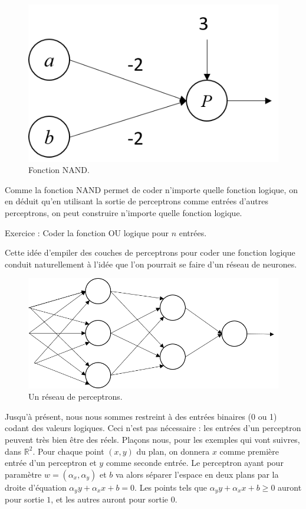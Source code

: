 \begin{figure}[h]
  \centering
  \includegraphics[scale=0.5]{assets/nand-perceptron}
  \caption{Fonction NAND.}
  \label{fig:nand-perceptron}
\end{figure}

Comme la fonction NAND permet de coder n'importe quelle fonction logique, 
on en déduit qu'en utilisant la sortie de perceptrons comme entrées d'autres 
perceptrons, on peut construire n'importe quelle fonction logique.

Exercice : Coder la fonction OU logique pour $n$ entrées.

Cette idée d'empiler des couches de perceptrons pour coder une fonction logique 
conduit naturellement à l'idée que l'on pourrait se faire d'un réseau de neurones.

\begin{figure}[h]
  \centering
  \includegraphics[scale=0.5]{assets/perceptron-network}
  \caption{Un réseau de perceptrons.}
  \label{fig:perceptron-network}
\end{figure}

Jusqu'à présent, nous nous sommes restreint à des entrées binaires (0 ou 1) 
codant des valeurs logiques. Ceci n'est pas nécessaire : les entrées d'un perceptron 
peuvent très bien être des réels.
Plaçons nous, pour les exemples qui vont suivres, dans $\mathbb{R}^2$. 
Pour chaque point $(x, y)$ du plan, on donnera $x$ comme première entrée d'un 
perceptron et $y$ comme seconde entrée. 
Le perceptron ayant pour paramètre $w=(\alpha_x, \alpha_y)$ et $b$ va alors 
séparer l'espace en deux plans par la droite d'équation $\alpha_y y + \alpha_x x + b = 0$. 
Les points tels que $\alpha_y y + \alpha_x x + b \geq 0$ auront pour sortie $1$, et 
les autres auront pour sortie $0$.

